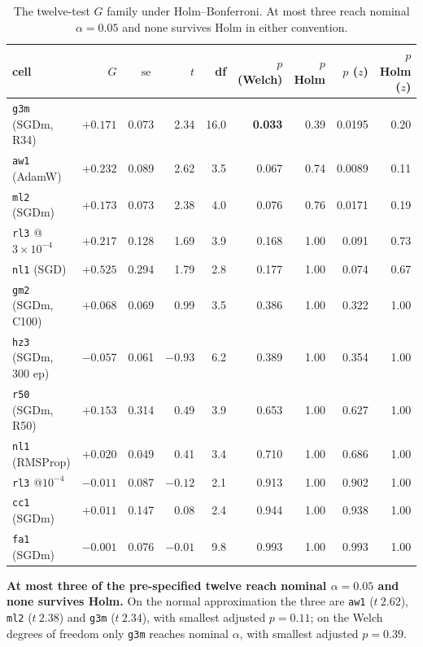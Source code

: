 \documentclass[10pt,letterpaper]{article}
\newcommand{\Gstat}{G}                         %
\newcommand{\arm}[1]{\texttt{#1}}
\DeclareMathOperator{\se}{se}
\begin{document}
\begin{table}[htbp]
\centering
\small
\caption{The twelve-test $\Gstat$ family under Holm--Bonferroni. At most three reach nominal
$\alpha = 0.05$ and none survives Holm in either convention.}
\label{tab:holm}
\begin{tabular}{@{}lrrrrrrrr@{}}
\toprule
cell & $\Gstat$ & $\se$ & $t$ & df & $p$ (Welch) & $p$ Holm & $p$ ($z$) & $p$ Holm ($z$) \\
\midrule
\arm{g3m} (SGDm, R34)   & $+0.171$ & 0.073 & 2.34 & 16.0 & \textbf{0.033} & 0.39 & 0.0195 & 0.20 \\
\arm{aw1} (AdamW)       & $+0.232$ & 0.089 & 2.62 & 3.5 & 0.067 & 0.74 & 0.0089 & 0.11 \\
\arm{ml2} (SGDm)        & $+0.173$ & 0.073 & 2.38 & 4.0 & 0.076 & 0.76 & 0.0171 & 0.19 \\
\arm{rl3} @$3{\times}10^{-4}$ & $+0.217$ & 0.128 & 1.69 & 3.9 & 0.168 & 1.00 & 0.091 & 0.73 \\
\arm{nl1} (SGD)         & $+0.525$ & 0.294 & 1.79 & 2.8 & 0.177 & 1.00 & 0.074 & 0.67 \\
\arm{gm2} (SGDm, C100)  & $+0.068$ & 0.069 & 0.99 & 3.5 & 0.386 & 1.00 & 0.322 & 1.00 \\
\arm{hz3} (SGDm, 300 ep)& $-0.057$ & 0.061 & $-0.93$ & 6.2 & 0.389 & 1.00 & 0.354 & 1.00 \\
\arm{r50} (SGDm, R50)   & $+0.153$ & 0.314 & 0.49 & 3.9 & 0.653 & 1.00 & 0.627 & 1.00 \\
\arm{nl1} (RMSProp)     & $+0.020$ & 0.049 & 0.41 & 3.4 & 0.710 & 1.00 & 0.686 & 1.00 \\
\arm{rl3} @$10^{-4}$    & $-0.011$ & 0.087 & $-0.12$ & 2.1 & 0.913 & 1.00 & 0.902 & 1.00 \\
\arm{cc1} (SGDm)        & $+0.011$ & 0.147 & 0.08 & 2.4 & 0.944 & 1.00 & 0.938 & 1.00 \\
\arm{fa1} (SGDm)        & $-0.001$ & 0.076 & $-0.01$ & 9.8 & 0.993 & 1.00 & 0.993 & 1.00 \\
\bottomrule
\end{tabular}
\end{table}

\textbf{At most three of the pre-specified twelve reach nominal $\alpha = 0.05$ and none survives
Holm.} On the
normal approximation the three are \arm{aw1} ($t\ 2.62$), \arm{ml2} ($t\ 2.38$) and \arm{g3m}
($t\ 2.34$), with smallest adjusted $p = 0.11$; on the Welch degrees of freedom only \arm{g3m}
reaches nominal $\alpha$, with smallest adjusted $p = 0.39$.
\end{document}
